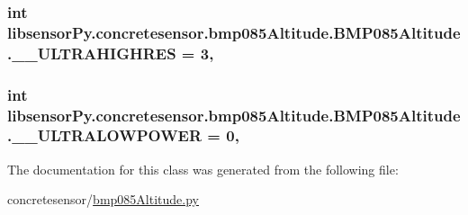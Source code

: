 \subsubsection[{\+\_\+\+\_\+\+U\+L\+T\+R\+A\+H\+I\+G\+H\+R\+E\+S}]{\setlength{\rightskip}{0pt plus 5cm}int libsensor\+Py.\+concretesensor.\+bmp085\+Altitude.\+B\+M\+P085\+Altitude.\+\_\+\+\_\+\+U\+L\+T\+R\+A\+H\+I\+G\+H\+R\+E\+S = 3\hspace{0.3cm}{\ttfamily [static]}, {\ttfamily [private]}}\label{classlibsensorPy_1_1concretesensor_1_1bmp085Altitude_1_1BMP085Altitude_a34dd7076d60503427beff151d4a64792}
\hypertarget{classlibsensorPy_1_1concretesensor_1_1bmp085Altitude_1_1BMP085Altitude_a0e429a25df8c5a434169ab3509145e86}{}
\subsubsection[{\+\_\+\+\_\+\+U\+L\+T\+R\+A\+L\+O\+W\+P\+O\+W\+E\+R}]{\setlength{\rightskip}{0pt plus 5cm}int libsensor\+Py.\+concretesensor.\+bmp085\+Altitude.\+B\+M\+P085\+Altitude.\+\_\+\+\_\+\+U\+L\+T\+R\+A\+L\+O\+W\+P\+O\+W\+E\+R = 0\hspace{0.3cm}{\ttfamily [static]}, {\ttfamily [private]}}\label{classlibsensorPy_1_1concretesensor_1_1bmp085Altitude_1_1BMP085Altitude_a0e429a25df8c5a434169ab3509145e86}


The documentation for this class was generated from the following file\+:\begin{DoxyCompactItemize}
\item 
concretesensor/\hyperlink{concretesensor_2bmp085Altitude_8py}{bmp085\+Altitude.\+py}\end{DoxyCompactItemize}
